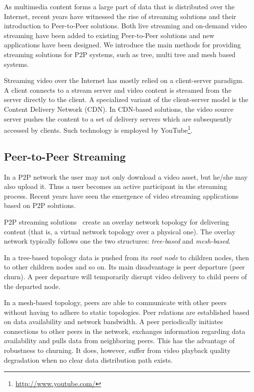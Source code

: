 As multimedia content forms a large part of data that is distributed over the
Internet, recent years have witnessed the rise of streaming solutions and
their introduction to Peer-to-Peer solutions. Both live streaming and
on-demand video streaming have been added to existing Peer-to-Peer solutions
and new applications have been designed. We introduce the main methods for
providing streaming solutions for P2P systems, such as tree, multi tree and
mesh based systems.

Streaming video over the Internet has mostly relied on a client-server
paradigm. A client connects to a stream server and video content is streamed
from the server directly to the client. A specialized variant of the
client-server model is the Content Delivery Network (CDN). In CDN-based
solutions, the video source server pushes the content to a set of delivery
servers which are subsequently accessed by clients. Such technology is
employed by YouTube\footnote{\url{http://www.youtube.com/}}.

\subsection{Peer-to-Peer Streaming}
\label{subsec:p2p-systems:p2p-streaming-p2p}

In a P2P network the user may not only download a video asset, but he/she may
also upload it. Thus a user becomes an active participant in the streaming
process. Recent years have seen the emergence of video streaming applications
based on P2P solutions.

P2P streaming solutions~\cite{p2p-streaming-survey} create an overlay network
topology for delivering content (that is, a virtual network topology over a
physical one).  The overlay network typically follows one the two structures:
\textit{tree-based} and \textit{mesh-based}.

In a tree-based topology data is pushed from its \textit{root node} to
children nodes, then to other children nodes and so on. Its main disadvantage
is peer departure (peer churn). A peer departure will temporarily
disrupt video delivery to child peers of the departed node.

In a mesh-based topology, peers are able to communicate with other peers without
having to adhere to static topologies. Peer relations are established based on
data availability and network bandwidth. A peer periodically initiates
connections to other peers in the network, exchanges information regarding
data availability and pulls data from neighboring peers. This has the
advantage of robustness to churning. It does, however, suffer from video
playback quality degradation when no clear data distribution path exists.

